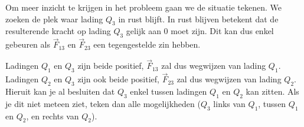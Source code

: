 \documentclass{ximera}
\begin{document}
\begin{example}[foldable=true,title={Voorbeeld: drie ladingen op één lijn of lading in evenwicht}]
\begin{solution}
        Om meer inzicht te krijgen in het probleem gaan we de situatie tekenen. We zoeken de plek waar lading $Q_{3}$ in rust blijft. In rust blijven betekent dat de resulterende kracht op lading $Q_{3}$ gelijk aan 0 moet zijn. Dit kan dus enkel gebeuren als $\vec{F}_{13}$ en $\vec{F}_{23}$ een tegengestelde zin hebben. 
        
        Ladingen $Q_{1}$ en $Q_{3}$ zijn beide positief, $\vec{F}_{13}$ zal dus wegwijzen van lading $Q_1$. Ladingen $Q_{2}$ en $Q_{3}$ zijn ook beide positief, $\vec{F}_{23}$ zal dus wegwijzen van lading $Q_{2}$. Hieruit kan je al besluiten dat $Q_{3}$ enkel tussen ladingen $Q_{1}$ en $Q_{2}$ kan zitten. Als je dit niet meteen ziet, teken dan alle mogelijkheden ($Q_{3}$ links van $Q_{1}$, tussen $Q_{1}$ en $Q_{2}$, en rechts van $Q_{2}$).
        
        \begin{center}
            \end{center}
        

\end{solution}
\end{example}
\end{document}
